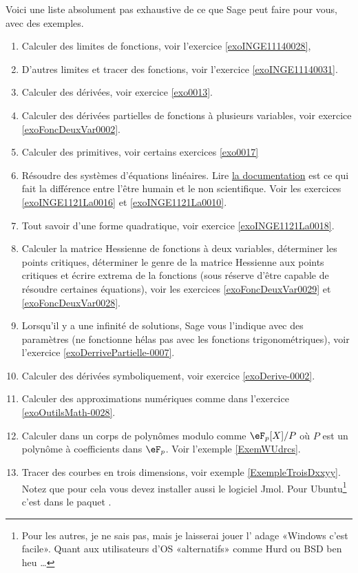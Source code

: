 Voici une liste absolument pas exhaustive de ce que Sage peut faire pour vous, avec des exemples. 
\begin{enumerate}

	\item
		Calculer des limites de fonctions, voir l'exercice \ref{exoINGE11140028},

	\item
		D'autres limites et tracer des fonctions, voir l'exercice \ref{exoINGE11140031}.
	\item
		Calculer des dérivées, voir exercice \ref{exo0013}.
	\item
		Calculer des dérivées partielles de fonctions à plusieurs variables, voir exercice \ref{exoFoncDeuxVar0002}.
	\item
		Calculer des primitives, voir certains exercices \ref{exo0017}
	\item

		Résoudre des systèmes d'équations linéaires. Lire \href{http://www.sagemath.org/doc/constructions/linear_algebra.html#solving-systems-of-linear-equations}{la documentation} est ce qui fait la différence entre l'être humain et le non scientifique. Voir les exercices  \ref{exoINGE1121La0016} et \ref{exoINGE1121La0010}.

	\item
		Tout savoir d'une forme quadratique, voir exercice \ref{exoINGE1121La0018}.
	\item
		Calculer la matrice Hessienne de fonctions à deux variables, déterminer les points critiques, déterminer le genre de la matrice Hessienne aux points critiques et écrire extrema de la fonctions (sous réserve d'être capable de résoudre certaines équations), voir les exercices \ref{exoFoncDeuxVar0029} et \ref{exoFoncDeuxVar0028}.
	\item
		Lorsqu'il y a une infinité de solutions, Sage vous l'indique avec des paramètres (ne fonctionne hélas pas avec les fonctions trigonométriques), voir l'exercice \ref{exoDerrivePartielle-0007}.


	\item
		Calculer des dérivées symboliquement, voir exercice \ref{exoDerive-0002}.
	\item
		Calculer des approximations numériques comme dans l'exercice \ref{exoOutilsMath-0028}.
    \item
        Calculer dans un corps de polynômes modulo comme \( \eF_p[X]/P\) où \( P\) est un polynôme à coefficients dans \( \eF_p\). Voir l'exemple \ref{ExemWUdrcs}.
	\item
        Tracer des courbes en trois dimensions, voir exemple \ref{ExempleTroisDxxyy}. Notez que pour cela vous devez installer aussi le logiciel Jmol. Pour Ubuntu\footnote{Pour les autres, je ne sais pas, mais je laisserai jouer l' adage «Windows c'est facile». Quant aux utilisateurs d'OS «alternatifs» comme Hurd ou BSD ben heu \ldots} c'est dans le paquet .
\end{enumerate}

